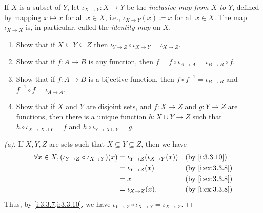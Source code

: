 \begin{ex}\label{i:ex:3.3.8}
  If \(X\) is a subset of \(Y\), let \(\iota_{X \to Y} : X \to Y\) be the \emph{inclusive map from \(X\) to \(Y\)}, defined by mapping \(x \mapsto x\) for all \(x \in X\), i.e., \(\iota_{X \to Y}(x) \coloneqq x\) for all \(x \in X\).
  The map \(\iota_{X \to X}\) is, in particular, called the \emph{identity map} on \(X\).
  \begin{enumerate}
    \item Show that if \(X \subseteq Y \subseteq Z\) then \(\iota_{Y \to Z} \circ \iota_{X \to Y} = \iota_{X \to Z}\).
    \item Show that if \(f : A \to B\) is any function, then \(f = f \circ \iota_{A \to A} = \iota_{B \to B} \circ f\).
    \item Show that if \(f : A \to B\) is a bijective function, then \(f \circ f^{-1} = \iota_{B \to B}\) and \(f^{-1} \circ f = \iota_{A \to A}\).
    \item Show that if \(X\) and \(Y\) are disjoint sets, and \(f : X \to Z\) and \(g : Y \to Z\) are functions, then there is a unique function \(h : X \cup Y \to Z\) such that \(h \circ \iota_{X \to X \cup Y} = f\) and \(h \circ \iota_{Y \to X \cup Y} = g\).
  \end{enumerate}
\end{ex}

\begin{proof}[(a)]
  If \(X, Y, Z\) are sets such that \(X \subseteq Y \subseteq Z\), then we have
  \begin{align*}
    \forall x \in X, (\iota_{Y \to Z} \circ \iota_{X \to Y})(x) & = \iota_{Y \to Z}(\iota_{X \to Y}(x)) &  & \by{i:3.3.10}   \\
                                                                & = \iota_{Y \to Z}(x)                  &  & \by{i:ex:3.3.8} \\
                                                                & = x                                   &  & \by{i:ex:3.3.8} \\
                                                                & = \iota_{X \to Z}(x).                 &  & \by{i:ex:3.3.8}
  \end{align*}
  Thus, by \cref{i:3.3.7,i:3.3.10}, we have \(\iota_{Y \to Z} \circ \iota_{X \to Y} = \iota_{X \to Z}\).
\end{proof}

